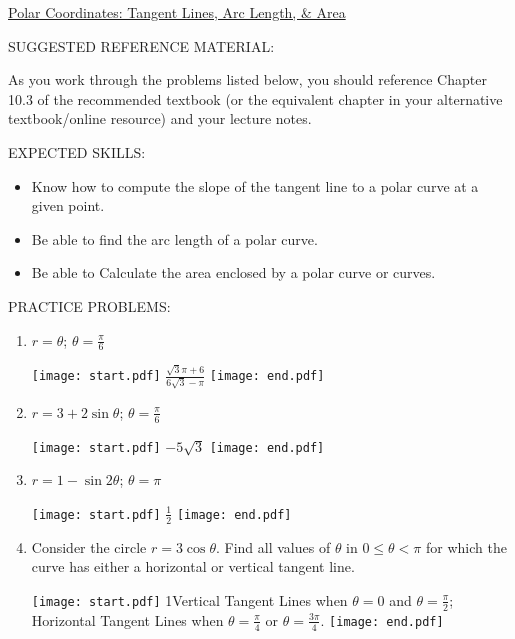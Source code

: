 \documentclass[12pt]{article}
\begin{document}
\begin{center}
\underline{\LARGE{Polar Coordinates: Tangent Lines, Arc Length, \& Area}}
\end{center}

\noindent SUGGESTED REFERENCE MATERIAL:

\bigskip

\noindent As you work through the problems listed below, you should reference Chapter 10.3 of the recommended textbook (or the equivalent chapter in your alternative textbook/online resource) and your lecture notes.

\bigskip

\noindent EXPECTED SKILLS:

\begin{itemize}

\item Know how to compute the slope of the tangent line to a polar curve at a given point. 

\item Be able to find the arc length of a polar curve.

\item Be able to Calculate the area enclosed by a polar curve or curves.

\end{itemize}

\noindent PRACTICE PROBLEMS:

\medskip


\begin{enumerate}

\item $r=\theta$; $\theta=\frac{\pi}{6}$ 

\texttt{[image: start.pdf]}
{{$\frac{\sqrt{3}\pi+6}{6\sqrt{3}-\pi}$}}
\texttt{[image: end.pdf]}


\item $r=3+2\sin{\theta}$; $\theta=\frac{\pi}{6}$ 

\texttt{[image: start.pdf]}
{{$-5\sqrt{3}$}}
\texttt{[image: end.pdf]}


\item $r=1-\sin{2\theta}$; $\theta = \pi$ 

\texttt{[image: start.pdf]}
{{$\frac{1}{2}$}}
\texttt{[image: end.pdf]}


\item Consider the circle $r=3\cos{\theta}$.  Find all values of $\theta$ in $0 \leq \theta < \pi$ for which the curve has either a horizontal or vertical tangent line.

\texttt{[image: start.pdf]}
{{{1\linewidth}{Vertical Tangent Lines when $\theta=0$ and $\theta=\frac{\pi}{2}$;\\ Horizontal Tangent Lines when $\theta=\frac{\pi}{4}$ or $\theta=\frac{3\pi}{4}$.}}}
\texttt{[image: end.pdf]}


\end{enumerate}
\end{document}
